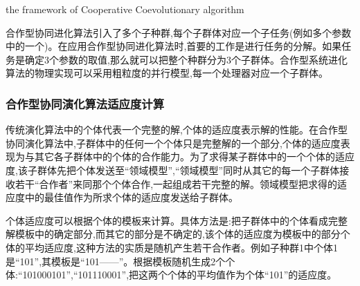 \documentclass[a4paper]{article}
\begin{document}
    \begin{algorithm}[H]
        
        \caption{the framework of Cooperative Coevolutionary algorithm}
        \label{alg2}
        \onehalfspacing

        \begin{algorithmic}[1]
            \EndFor
                \EndFor
            \EndFor
            \EndFor
        \end{algorithmic}

    \end{algorithm}

    合作型协同进化算法引入了多个子种群,每个子群体对应一个子任务(例如多个参数中的一个)。在应用合作型协同进化算法时,首要的工作是进行任务的分解。如果任务是确定3个参数的取值,那么就可以把整个种群分为3个子群体。合作型系统进化算法的物理实现可以采用粗粒度的并行模型,每一个处理器对应一个子群体。

    \subsubsection{合作型协同演化算法适应度计算}

    传统演化算法中的个体代表一个完整的解,个体的适应度表示解的性能。在合作型协同演化算法中,子群体中的任何一个个体只是完整解的一个部分,个体的适应度表现为与其它各子群体中的个体的合作能力。为了求得某子群体中的一个个体的适应度,该子群体先把个体发送至“领域模型”,“领域模型”同时从其它的每一个子群体接收若干“合作者”来同那个个体合作,一起组成若干完整的解。领域模型把求得的适应度中的最佳值作为所求个体的适应度发送给子群体。
    
    个体适应度可以根据个体的模板来计算。具体方法是:把子群体中的个体看成完整解模板中的确定部分,而其它的部分是不确定的,该个体的适应度为模板中的部分个体的平均适应度,这种方法的实质是随机产生若干合作者。例如子种群1中个体1是“101”,其模板是“101------”。根据模板随机生成2个个体:“101000101”,“101110001”,把这两个个体的平均值作为个体“101”的适应度。
    
\end{document}
